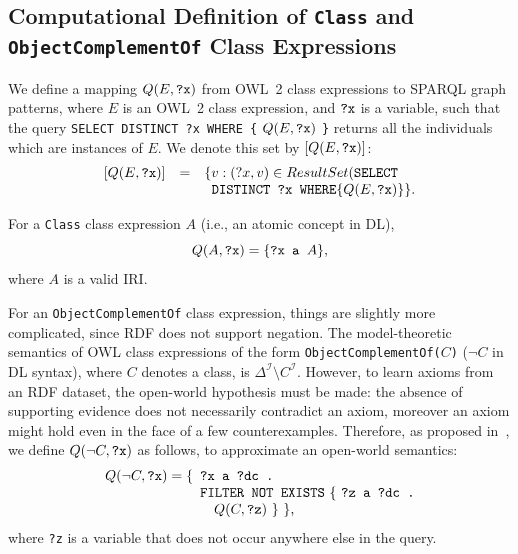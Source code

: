 \documentclass{sig-alternate}
\newcommand{\todo}[1]{\par\framebox{\parbox{3in}{#1}}\par}
\begin{document}
\subsection{Computational Definition of \texttt{Class} and \texttt{ObjectComplementOf} Class Expressions}
We define a mapping $Q(E, \mbox{\tt ?x})$ from OWL~2 class expressions to SPARQL graph patterns,
where $E$ is an OWL~2 class expression, and $\mbox{\tt ?x}$ is a variable,
such that the query
\texttt{SELECT DISTINCT ?x WHERE \{} $Q(E, \mbox{\tt ?x})$ \texttt{\}}
returns all the individuals which are instances of $E$. We denote this set by
$[Q(E, \mbox{\tt ?x})]$:
\begin{equation}
  \begin{array}{rcl}
    [Q(E, \mbox{\tt ?x})] &=& \{ v : (?x, v) \in ResultSet(\mbox{\tt SELECT}\\
                          & & \mbox{\tt\ DISTINCT ?x WHERE} \{ Q(E, \mbox{\tt ?x}) \} \}.
  \end{array}
\end{equation} 

For a \texttt{Class} class expression $A$ (i.e., an atomic concept in DL), 
\begin{equation}
Q(A, \mbox{\tt ?x}) = \{\mbox{\tt ?x a }A \},
\end{equation}
where $A$ is a valid IRI.

For an \texttt{ObjectComplementOf} class expression, things are slightly more complicated, since RDF does not support
negation. The model-theoretic semantics of OWL class expressions of the form \texttt{ObjectComplementOf(}$C$\texttt{)}
($\neg C$ in DL syntax), where $C$ denotes a class, is $\Delta^\mathcal{I} \setminus C^\mathcal{I}$.
However, to learn axioms from an RDF dataset, the open-world hypothesis must be made: the absence of
supporting evidence does not necessarily contradict an axiom, moreover an axiom might
hold even in the face of a few counterexamples.
Therefore, as proposed in~\cite{TettamanziFaronZuckerGandon2014ekaw}, we define
$Q(\neg C, \mbox{\tt ?x})$ as follows, to approximate an open-world semantics:
\begin{equation}\label{eq:approx-open-world-negation}
  Q(\neg C, \mbox{\tt ?x}) =
  \begin{minipage}[t]{2in}
    \begin{tabbing}
      \quad\=\quad\=\quad\=\kill
      \{\>\texttt{?x a ?dc .}\\
        \>\texttt{FILTER NOT EXISTS} \{ \texttt{?z a ?dc . }\\
        \>\>$Q(C, \mbox{\tt ?z})$ \} \},
    \end{tabbing}
  \end{minipage}
\end{equation}
where \texttt{?z} is a variable that does not occur anywhere else in the query.
\end{document}
